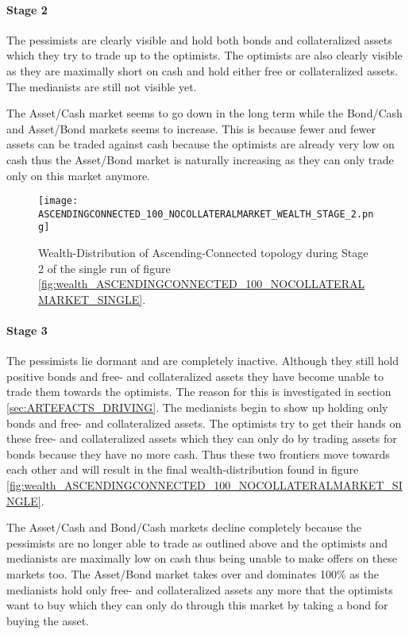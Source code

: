 \documentclass[Bachelorarbeit.tex]{subfiles}
\begin{document}
\paragraph{Stage 2}
The pessimists are clearly visible and hold both bonds and collateralized assets which they try to trade up to the optimists. The optimists are also clearly visible as  they are maximally short on cash and hold either free or collateralized assets. The medianists are still not visible yet.

\medskip

The Asset/Cash market seems to go down in the long term while the Bond/Cash and Asset/Bond markets seems to increase. This is because fewer and fewer assets can be traded against cash because the optimists are already very low on cash thus the Asset/Bond market is naturally increasing as they can only trade only on this market anymore.

\begin{figure}[H]
	\centering
  \texttt{[image: ASCENDINGCONNECTED\_100\_NOCOLLATERALMARKET\_WEALTH\_STAGE\_2.png]}
  	\caption{Wealth-Distribution of Ascending-Connected topology during Stage 2 of the single run of figure \ref{fig:wealth_ASCENDINGCONNECTED_100_NOCOLLATERALMARKET_SINGLE}.}
	\label{fig:markets_ASCENDINGCONNECTED_100_NOCOLLATERALMARKET_WEALTH_STAGE_2}
\end{figure}
		
\paragraph{Stage 3}
The pessimists lie dormant and are completely inactive. Although they still hold positive bonds and free- and collateralized assets they have become unable to trade them towards the optimists. The reason for this is investigated in section \ref{sec:ARTEFACTS_DRIVING}. The medianists begin to show up holding only bonds and free- and collateralized assets. The optimists try to get their hands on these free- and collateralized assets which they can only do by trading assets for bonds because they have no more cash. Thus these two frontiers move towards each other and will result in the final wealth-distribution found in figure \ref{fig:wealth_ASCENDINGCONNECTED_100_NOCOLLATERALMARKET_SINGLE}.

\medskip

The Asset/Cash and Bond/Cash markets decline completely because the pessimists are no longer able to trade as outlined above and the optimists and medianists are maximally low on cash thus being unable to make offers on these markets too. The Asset/Bond market takes over and dominates 100\% as the medianists hold only free- and collateralized assets any more that the optimists want to buy which they can only do through this market by taking a bond for buying the asset.
\end{document}
